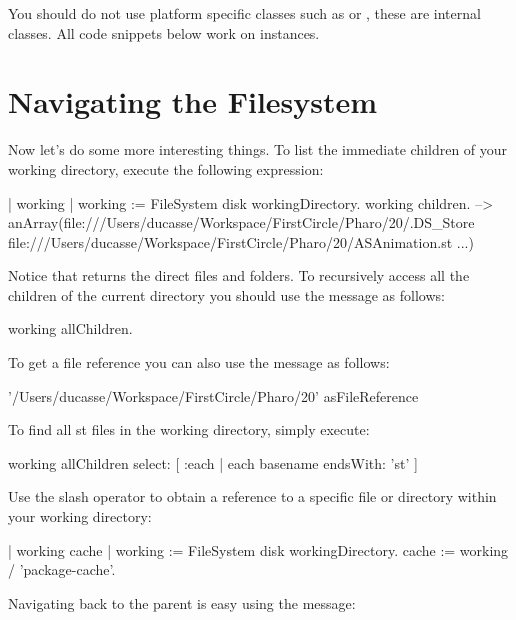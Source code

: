 \documentclass[a4paper,10pt,twoside]{book}
\begin{document}
You should do not use platform specific classes such as  or , these are internal classes. All code snippets below work on  instances.


\section{Navigating the Filesystem}

Now let's do some more interesting things. To list the immediate children of your working directory, execute the following expression:

\begin{code}{}
| working |
working := FileSystem disk workingDirectory.
working children.
--> anArray(file:///Users/ducasse/Workspace/FirstCircle/Pharo/20/.DS_Store file:///Users/ducasse/Workspace/FirstCircle/Pharo/20/ASAnimation.st ...)
\end{code} 

Notice that  returns the direct files and folders. 
To recursively access all the children of the current directory you should use the message  as follows:

\begin{code}{}
working allChildren.
\end{code}


To get a file reference you can also use the  message as follows: 

\begin{code}{}
'/Users/ducasse/Workspace/FirstCircle/Pharo/20' asFileReference
\end{code}



To find all st files in the working directory, simply execute:

\begin{code}{}
working allChildren select: [ :each | each basename endsWith: 'st' ]
\end{code} 
 
Use the slash operator to obtain a reference to a specific file or directory within your working directory:

\begin{code}{}
| working cache |
working := FileSystem disk workingDirectory.
cache := working / 'package-cache'.
\end{code} 

Navigating back to the parent is easy using the  message:
\end{document}
